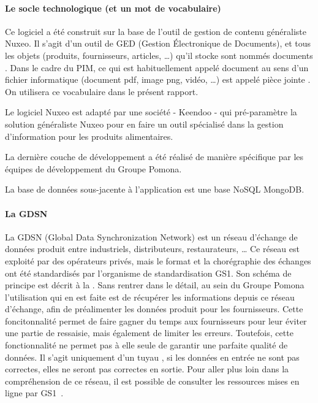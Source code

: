                 \paragraph{Le socle technologique (et un mot de vocabulaire)}

                Ce logiciel a été construit sur la base de l'outil de gestion de contenu généraliste Nuxeo.
                Il s'agit d'un outil de GED (Gestion \'{E}lectronique de Documents), et tous les objets (produits, fournisseurs, articles, \dots) qu'il stocke sont nommés \og documents \fg.
                Dans le cadre du PIM, ce qui est habituellement appelé \og document \fg au sens d'un fichier informatique (document pdf, image png, vidéo, \dots) est appelé \og pièce jointe \fg.
                On utilisera ce vocabulaire dans le présent rapport.

                Le logiciel Nuxeo est adapté par une société - Keendoo - qui pré-paramètre la solution généraliste Nuxeo pour en faire un outil spécialisé dans la gestion d'information pour les produits alimentaires.

                La dernière \og couche \fg de développement a été réalisé de manière spécifique par les équipes de développement du Groupe Pomona.

                La base de données sous-jacente à l'application est une base NoSQL MongoDB.
 
                \paragraph{La GDSN}

                \label{GDSN}
                La GDSN (Global Data Synchronization Network) est un réseau d'échange de données produit entre industriels, distributeurs, restaurateurs, \dots
                Ce réseau est exploité par des opérateurs privés, mais le format et la chorégraphie des échanges ont été standardisés par l'organisme de standardisation GS1.
                Son schéma de principe est décrit à la .
                Sans rentrer dans le détail, au sein du Groupe Pomona l'utilisation qui en est faite est de récupérer les informations depuis ce réseau d'échange, afin de préalimenter les données produit pour les fournisseurs.
                Cette foncitonnalité permet de faire gagner du temps aux fournisseurs pour leur éviter une partie de ressaisie, mais également de limiter les erreurs.
                Toutefois, cette fonctionnalité ne permet pas à elle seule de garantir une parfaite qualité de données.
                Il s'agit uniquement d'un \og tuyau \fg, si les données en entrée ne sont pas correctes, elles ne seront pas correctes en sortie.
                Pour aller plus loin dans la compréhension de ce réseau, il est possible de consulter les ressources mises en ligne par GS1~\cite{GDSN_GS1_FR}\cite{GDSN_GS1_GLOBAL}.

